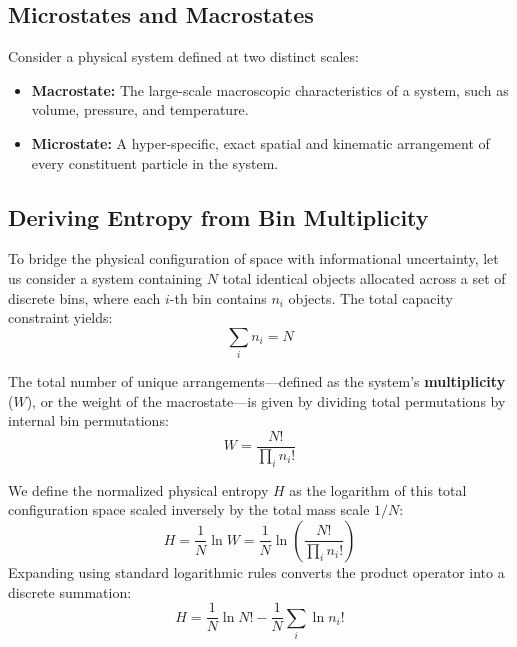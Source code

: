 \documentclass[11pt,a4paper]{article}
\begin{document}
\subsection{Microstates and Macrostates}
Consider a physical system defined at two distinct scales:
\begin{itemize}
    \item \textbf{Macrostate:} The large-scale macroscopic characteristics of a system, such as volume, pressure, and temperature.
    \item \textbf{Microstate:} A hyper-specific, exact spatial and kinematic arrangement of every constituent particle in the system.
\end{itemize}

\subsection{Deriving Entropy from Bin Multiplicity}
To bridge the physical configuration of space with informational uncertainty, let us consider a system containing $N$ total identical objects allocated across a set of discrete bins, where each $i$-th bin contains $n_i$ objects. The total capacity constraint yields:
\begin{equation}
\sum_{i} n_i = N
\end{equation}

The total number of unique arrangements—defined as the system's \textbf{multiplicity} ($W$), or the weight of the macrostate—is given by dividing total permutations by internal bin permutations:
\begin{equation}
W = \frac{N!}{\prod_{i} n_i!}
\end{equation}

We define the normalized physical entropy $H$ as the logarithm of this total configuration space scaled inversely by the total mass scale $1/N$:
\begin{equation}
H = \frac{1}{N} \ln W = \frac{1}{N} \ln \left( \frac{N!}{\prod_{i} n_i!} \right)
\end{equation}
Expanding using standard logarithmic rules converts the product operator into a discrete summation:
\begin{equation}
H = \frac{1}{N} \ln N! - \frac{1}{N} \sum_{i} \ln n_i!
\end{equation}
\end{document}
